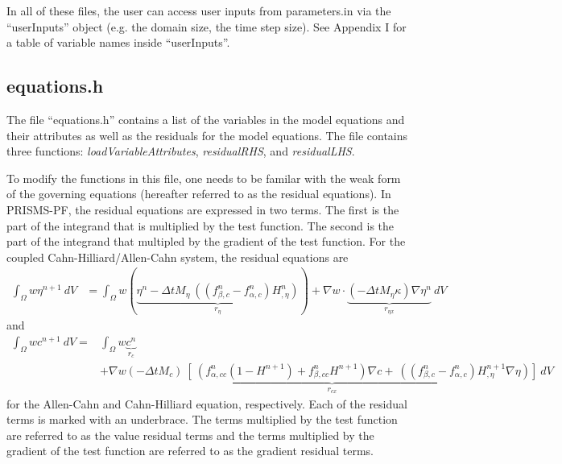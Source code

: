 \documentclass[10pt]{article} %
\begin{document}
In all of these files, the user can access user inputs from parameters.in via the ``userInputs'' object (e.g. the domain size, the time step size). See Appendix I for a table of variable names inside ``userInputs''.

\subsection{equations.h} \label{equations}
The file ``equations.h'' contains a list of the variables in the model equations and their attributes as well as the residuals for the model equations. The file contains three functions: \emph{loadVariableAttributes}, \emph{residualRHS}, and \emph{residualLHS}. 

To modify the functions in this file, one needs to be familar with the weak form of the governing equations (hereafter referred to as the residual equations). In PRISMS-PF, the residual equations are expressed in two terms. The first is the part of the integrand that is multiplied by the test function. The second is the part of the integrand that multipled by the gradient of the test function. For the coupled Cahn-Hilliard/Allen-Cahn system, the residual equations are 
\begin{align}
  \int_{\Omega}   w  \eta^{n+1}  ~dV &=\int_{\Omega}  w  \left( \underbrace{\eta^{n} - \Delta t M_{\eta}~ ((f_{\beta,c}^n-f_{\alpha,c}^n)H_{,\eta}^n)}_{r_{\eta}} \right)+ \nabla w \cdot \underbrace{(- \Delta t M_{\eta}\kappa) \nabla \eta^{n}}_{r_{\eta x}} ~dV 
\end{align}
and 
\begin{align}
  \int_{\Omega}   w  c^{n+1}  ~dV = &\int_{\Omega}   w \underbrace{c^{n}}_{r_c} \\&+  \nabla w   \underbrace{(-\Delta t M_{c})~ [~(f_{\alpha,cc}^n(1-H^{n+1})+f_{\beta,cc}^n H^{n+1}) \nabla c + ~((f_{\beta,c}^n-f_{\alpha,c}^n)H^{n+1}_{,\eta} \nabla \eta) ] }_{r_{cx}} ~dV
\end{align}
for the Allen-Cahn and Cahn-Hilliard equation, respectively. Each of the residual terms is marked with an underbrace. The terms multiplied by the test function are referred to as the value residual terms and the terms multiplied by the gradient of the test function are referred to as the gradient residual terms.
\end{document}
